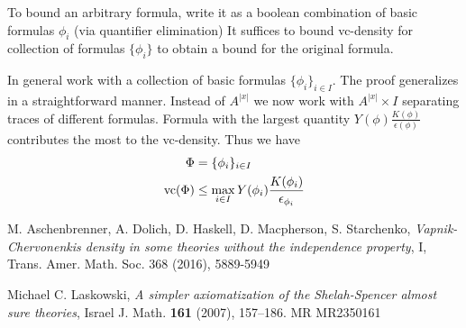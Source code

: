 \documentclass{amsart}
\begin{document}
To bound an arbitrary formula, write it as a boolean combination of basic formulas $\phi_i$ (via quantifier elimination)
It suffices to bound vc-density for collection of formulas $\{\phi_i\}$ to obtain a bound for the original formula.

In general work with a collection of basic formulas $\{\phi_i\}_{i \in I}$.
The proof generalizes in a straightforward manner.
Instead of $A^{|x|}$ we now work with $A^{|x|} \times I$ separating traces of different formulas.
Formula with the largest quantity $Y(\phi)\frac{K(\phi)}{\epsilon(\phi)}$ contributes the most to the vc-density.
Thus we have
\begin{align*}
  \Phi &= \{\phi_i\}_{i \in I} \\
  \operatorname{vc}(\Phi) &\leq   \max_{i \in I} Y(\phi_i) \frac{K(\phi_i)}{\epsilon_{\phi_i}}
\end{align*}


\begin{thebibliography}{9}

  M. Aschenbrenner, A. Dolich, D. Haskell, D. Macpherson, S. Starchenko,
  \textit{Vapnik-Chervonenkis density in some theories without the independence property}, I,
  Trans. Amer. Math. Soc. 368 (2016), 5889-5949
  
  Michael C. Laskowski, \textit{A simpler axiomatization of the Shelah-Spencer almost sure theories},
  Israel J. Math. \textbf{161} (2007), 157–186. MR MR2350161	

\end{thebibliography}
\end{document}
